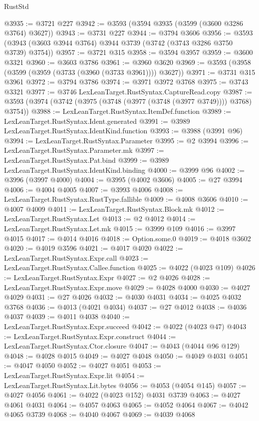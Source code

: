 \begin{lexlean}{RustStd}
\begin{coremodule}
@3935 := @3721 @227
@3942 := @3593 (@3594 @3935 (@3599 (@3600 @3286 @3764) @3627))
@3943 := @3731 @227
@3944 := @3794 @3606
@3956 := @3593 (@3943 (@3603 @3944 @3764) @3944 @3739 (@3742 (@3743 @3286 @3750 @3739) @3754))
@3957 := @3721 @315
@3958 := @3594 @3957
@3959 := @3600 @3321
@3960 := @3603 @3786
@3961 := @3960 @3620
@3969 := @3593 (@3958 (@3599 (@3959 (@3733 (@3960 (@3733 @3961)))) @3627))
@3971 := @3731 @315 @3961
@3972 := @3794 @3786
@3974 := @3971 @3972 @3768
@3975 := @3743 @3321
@3977 := @3746 LexLeanTarget.RustSyntax.CaptureRead.copy
@3987 := @3593 (@3974 (@3742 (@3975 (@3748 (@3977 (@3748 (@3977 @3749)))) @3768) @3754))
@3988 := LexLeanTarget.RustSyntax.ItemDef.function
@3989 := LexLeanTarget.RustSyntax.Ident.generated
@3991 := @3989 LexLeanTarget.RustSyntax.IdentKind.function
@3993 := @3988 (@3991 @96)
@3994 := LexLeanTarget.RustSyntax.Parameter
@3995 := @2 @3994
@3996 := LexLeanTarget.RustSyntax.Parameter.mk
@3997 := LexLeanTarget.RustSyntax.Pat.bind
@3999 := @3989 LexLeanTarget.RustSyntax.IdentKind.binding
@4000 := @3999 @96
@4002 := @3996 (@3997 @4000)
@4004 := @3995 (@4002 @3606)
@4005 := @27 @3994
@4006 := @4004 @4005
@4007 := @3993 @4006
@4008 := LexLeanTarget.RustSyntax.RustType.fallible
@4009 := @4008 @3606
@4010 := @4007 @4009
@4011 := LexLeanTarget.RustSyntax.Block.mk
@4012 := LexLeanTarget.RustSyntax.Let
@4013 := @2 @4012
@4014 := LexLeanTarget.RustSyntax.Let.mk
@4015 := @3999 @109
@4016 := @3997 @4015
@4017 := @4014 @4016
@4018 := Option.some.{0}
@4019 := @4018 @3602
@4020 := @4019 @3596
@4021 := @4017 @4020
@4022 := LexLeanTarget.RustSyntax.Expr.call
@4023 := LexLeanTarget.RustSyntax.Callee.function
@4025 := @4022 (@4023 @109)
@4026 := LexLeanTarget.RustSyntax.Expr
@4027 := @2 @4026
@4028 := LexLeanTarget.RustSyntax.Expr.move
@4029 := @4028 @4000
@4030 := @4027 @4029
@4031 := @27 @4026
@4032 := @4030 @4031
@4034 := @4025 @4032 @3768
@4036 := @4013 (@4021 @4034)
@4037 := @27 @4012
@4038 := @4036 @4037
@4039 := @4011 @4038
@4040 := LexLeanTarget.RustSyntax.Expr.succeed
@4042 := @4022 (@4023 @47)
@4043 := LexLeanTarget.RustSyntax.Expr.construct
@4044 := LexLeanTarget.RustSyntax.Ctor.closure
@4047 := @4043 (@4044 @96 @129)
@4048 := @4028 @4015
@4049 := @4027 @4048
@4050 := @4049 @4031
@4051 := @4047 @4050
@4052 := @4027 @4051
@4053 := LexLeanTarget.RustSyntax.Expr.lit
@4054 := LexLeanTarget.RustSyntax.Lit.bytes
@4056 := @4053 (@4054 @145)
@4057 := @4027 @4056
@4061 := @4022 (@4023 @152) @4031 @3739
@4063 := @4027 @4061 @4031
@4064 := @4057 @4063
@4065 := @4052 @4064
@4067 := @4042 @4065 @3739
@4068 := @4040 @4067
@4069 := @4039 @4068

\end{coremodule}
\end{lexlean}
